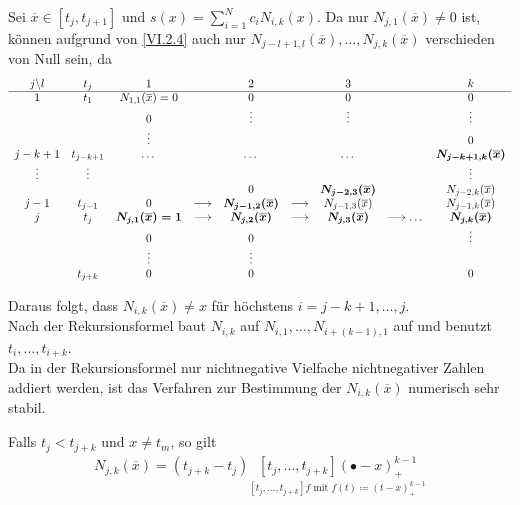 \label{6.2.8}
Sei $\overline{x}\in[t_j,t_{j+1}]$ und
$s(x) = \sum_{i=1}^{N}c_iN_{i,k}(x)$.
Da nur $N_{j,1}(\overline{x})\neq 0$ ist, 
können aufgrund von \eqref{VI.2.4}
auch nur $N_{j-l+1, l}(\overline{x}), \dots, N_{j,k}(\overline{x})$
verschieden von Null sein, da
\begin{align*}
  \begin{array}{ccccccccc}
    j\backslash l & t_j & 1 && 2 && 3 &&k\\
    \cline{1-9}
    1 & t_1 & N_{1,1}(\overline{x})=0 &&0&&0&&0\\
                  &&0&&\vdots&&\vdots&&\vdots\\
                  &&\vdots &&&&&&0\\
    j-k+1&t_{j-k+1} &\dots &&\dots&&\dots&&\boldsymbol{N_{j-k+1,k}(\overline{x})} \\
    \vdots&\vdots&&&&&&&\vdots\\
                  && &&0&& \boldsymbol{N_{j-2,3}(\overline{x})}
                                 &&N_{j-2,k}(\overline{x})\\
    j-1 & t_{j-1} &0 &\longrightarrow & \boldsymbol{N_{j-1,2}(\overline{x})}
                                      &\longrightarrow & N_{j-1,3}(\overline{x})
            && N_{j-1,k}(\overline{x})\\
    j& t_j & \boldsymbol{N_{j,1}(\overline{x})=1}&\longrightarrow&\boldsymbol{N_{j,2}(\overline{x})}
                                      &\longrightarrow&\boldsymbol{N_{j,3}(\overline{x})}&\longrightarrow\dots&\boldsymbol{N_{j,k}(\overline{x})}\\
                  &&0&&0&&&&\vdots\\
                  &&\vdots &&\vdots\\
                  &t_{j+k}&0&&0&&&&0
  \end{array}
\end{align*}

Daraus folgt, dass $N_{i,k}(\overline{x})\neq x$ 
für höchstens $i=j-k+1,\dots, j$.\\
Nach der Rekursionsformel baut $N_{i,k}$ auf 
$N_{i,1},\dots , N_{i+(k-1),1}$ auf und
benutzt $t_i,\dots, t_{i+k}$.\\
Da in der Rekursionsformel nur nichtnegative Vielfache
nichtnegativer Zahlen addiert werden,
ist das Verfahren zur Bestimmung der $N_{i,k}(\overline{x})$
numerisch sehr stabil.

\begin{Leme}
  Falls $t_j<t_{j+k}$ und $x\neq t_m$,
  so gilt
  \begin{gather}
    N_{j,k}(\overline{x})=(t_{j+k}-t_j)\underset{
      [t_j,\dots, t_{j+k}]f\text{ mit } f(t)\coloneqq (t-x)_+^{k-1}}
    {[t_j,\dots,t_{j+k}](\bullet -x)_+^{k-1}}
    \label{VI.2.5}
  \end{gather}
\end{Leme}

